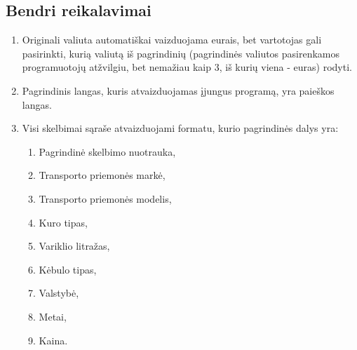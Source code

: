 \documentclass[12pt]{article}
\begin{document}
	\subsection{Bendri reikalavimai}	
	\begin{enumerate}[labelindent=10pt,leftmargin=2.2cm]
		\item Originali valiuta automatiškai vaizduojama eurais, bet vartotojas gali pasirinkti, kurią valiutą iš pagrindinių (pagrindinės valiutos pasirenkamos programuotojų atžvilgiu, bet nemažiau kaip 3, iš kurių viena - euras) rodyti.
		\item\label{MainWindowDisplayReq} Pagrindinis langas, kuris atvaizduojamas įjungus programą, yra paieškos langas.
		\item\label{AdParts} Visi skelbimai sąraše atvaizduojami formatu, kurio pagrindinės dalys yra:
		
		\begin{enumerate}[label=\theenumi.\arabic{enumii}]
			\item Pagrindinė skelbimo nuotrauka,
			\item Transporto priemonės markė,
			\item Transporto priemonės modelis,
			\item Kuro tipas,
			\item Variklio litražas,
			\item Kėbulo tipas,
			\item Valstybė,
			\item Metai,
			\item Kaina.
		\end{enumerate}
		

\end{enumerate}
\end{document}
